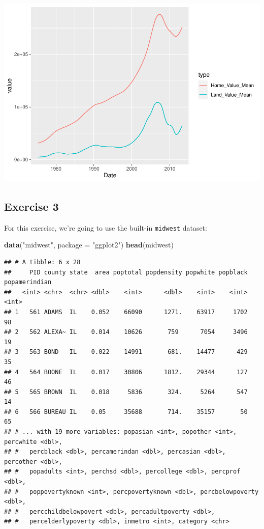 \documentclass[
]{book}
\newenvironment{Shaded}{\begin{snugshade}}{\end{snugshade}}
\newcommand{\DataTypeTok}[1]{\textcolor[rgb]{0.13,0.29,0.53}{#1}}
\newcommand{\KeywordTok}[1]{\textcolor[rgb]{0.13,0.29,0.53}{\textbf{#1}}}
\newcommand{\NormalTok}[1]{#1}
\newcommand{\StringTok}[1]{\textcolor[rgb]{0.31,0.60,0.02}{#1}}
\begin{document}
\includegraphics{R/Rgraphics/figures/unnamed-chunk-219-1.pdf}

\hypertarget{exercise-3-2}{%
\subsection{Exercise 3}\label{exercise-3-2}}

For this exercise, we're going to use the built-in \texttt{midwest} dataset:

\begin{Shaded}
\begin{Highlighting}[]
\KeywordTok{data}\NormalTok{(}\StringTok{"midwest"}\NormalTok{, }\DataTypeTok{package =} \StringTok{"ggplot2"}\NormalTok{)}
\KeywordTok{head}\NormalTok{(midwest)}
\end{Highlighting}
\end{Shaded}

\begin{verbatim}
## # A tibble: 6 x 28
##     PID county state  area poptotal popdensity popwhite popblack popamerindian
##   <int> <chr>  <chr> <dbl>    <int>      <dbl>    <int>    <int>         <int>
## 1   561 ADAMS  IL    0.052    66090      1271.    63917     1702            98
## 2   562 ALEXA~ IL    0.014    10626       759      7054     3496            19
## 3   563 BOND   IL    0.022    14991       681.    14477      429            35
## 4   564 BOONE  IL    0.017    30806      1812.    29344      127            46
## 5   565 BROWN  IL    0.018     5836       324.     5264      547            14
## 6   566 BUREAU IL    0.05     35688       714.    35157       50            65
## # ... with 19 more variables: popasian <int>, popother <int>, percwhite <dbl>,
## #   percblack <dbl>, percamerindan <dbl>, percasian <dbl>, percother <dbl>,
## #   popadults <int>, perchsd <dbl>, percollege <dbl>, percprof <dbl>,
## #   poppovertyknown <int>, percpovertyknown <dbl>, percbelowpoverty <dbl>,
## #   percchildbelowpovert <dbl>, percadultpoverty <dbl>,
## #   percelderlypoverty <dbl>, inmetro <int>, category <chr>
\end{verbatim}
\end{document}
